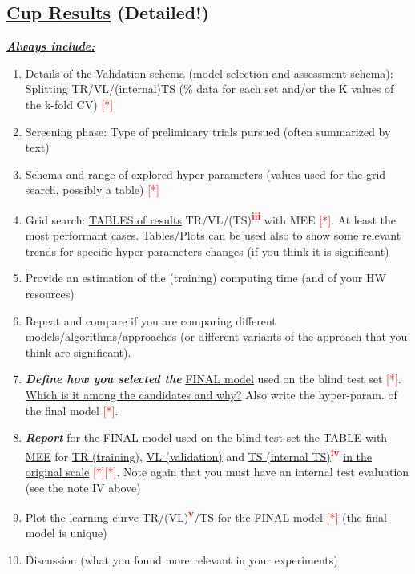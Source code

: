 \documentclass[11pt, letterpaper]{article}  %
\begin{document}
\subsection{\underline{Cup Results} (Detailed!)}
\underline{\textbf{\textit{Always include:}}}
\begin{enumerate}
    \setlength\itemsep{-0.25em}
    \item \underline{Details of the Validation schema} (model selection and assessment schema): Splitting  TR/VL/(internal)TS (\% data for each set and/or the K values of the k-fold CV)  \textcolor{red}{[*]}
    \item Screening phase: Type of preliminary trials pursued (often summarized by text) 
    \item Schema and \underline{range} of explored hyper-parameters (values used for the grid search, possibly a table) \textcolor{red}{[*]}
    \item Grid search: \underline{TABLES of results} TR/VL/(TS)\textsuperscript{\textbf{\textcolor{red}{iii}}} with MEE \textcolor{red}{[*]}. At least the most performant cases. Tables/Plots can be used also to show some relevant trends for specific hyper-parameters changes (if you think it is significant) 
    \item Provide an estimation of the (training) computing time (and of your HW resources)
    \item Repeat and compare if you are comparing different models/algorithms/approaches (or different variants of the approach that you think are significant). 
    \item \textbf{\textit{Define how you selected the}} \underline{FINAL model} used on the blind test set \textcolor{red}{[*]}. \underline{Which is it among the candidates and why?} Also write the  hyper-param. of the final model \textcolor{red}{[*]}.
    \item \textbf{\textit{Report}} for the \underline{FINAL model} used on the blind test set the \underline{TABLE with MEE} for \underline{TR (training)}, \underline{VL (validation)} and \underline{TS (internal TS)}\textsuperscript{\textbf{\textcolor{red}{iv}}} \underline{in the original scale} \textcolor{red}{[*]}\textcolor{red}{[*]}. Note again  that you must have an internal  test evaluation (see the note IV above)
    \item Plot the \underline{learning curve} TR/(VL)\textsuperscript{\textbf{\textcolor{red}{v}}}/TS for the FINAL model \textcolor{red}{[*]} (the final model is unique) 
    \item Discussion (what you found more relevant in your experiments)
\end{enumerate}
\end{document}
